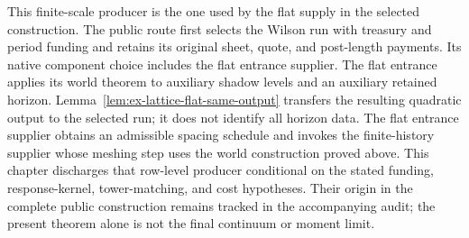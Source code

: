 \begin{remark}
\label{rem:ex-lattice-rg-public-route}
This finite-scale producer is the one used by the flat supply in the
selected construction. The public route first selects the Wilson run with
treasury and period funding and retains its original sheet, quote, and
post-length payments. Its native component choice includes the flat
entrance supplier. The flat entrance applies its world theorem to auxiliary shadow levels and an auxiliary retained horizon. Lemma~\ref{lem:ex-lattice-flat-same-output} transfers the resulting quadratic output to the selected run; it does not identify all horizon data. The flat entrance supplier obtains an
admissible spacing schedule and invokes the finite-history supplier whose
meshing step uses the world construction proved above. This chapter
discharges that row-level producer conditional on the stated funding,
response-kernel, tower-matching, and cost hypotheses. Their origin in the
complete public construction remains tracked in the accompanying audit;
the present theorem alone is not the final continuum or moment limit.
\end{remark}
